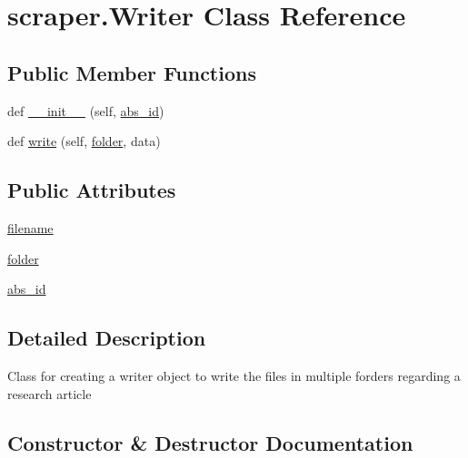\hypertarget{classscraper_1_1_writer}{}\section{scraper.\+Writer Class Reference}
\label{classscraper_1_1_writer}
\subsection*{Public Member Functions}
\begin{DoxyCompactItemize}
\item 
def \hyperlink{classscraper_1_1_writer_afa724461d579e43f6470d7166db1288b}{\+\_\+\+\_\+init\+\_\+\+\_\+} (self, \hyperlink{classscraper_1_1_writer_a56b4acdfb9dc914f431d51dacd60e463}{abs\+\_\+id})
\item 
def \hyperlink{classscraper_1_1_writer_a2b0261659fc51fc3c9fa37231d87d6c7}{write} (self, \hyperlink{classscraper_1_1_writer_a24df154d5f014a262fad63a36036a861}{folder}, data)
\end{DoxyCompactItemize}
\subsection*{Public Attributes}
\begin{DoxyCompactItemize}
\item 
\hyperlink{classscraper_1_1_writer_a5e6006cfece3245121900edb8054de7e}{filename}
\item 
\hyperlink{classscraper_1_1_writer_a24df154d5f014a262fad63a36036a861}{folder}
\item 
\hyperlink{classscraper_1_1_writer_a56b4acdfb9dc914f431d51dacd60e463}{abs\+\_\+id}
\end{DoxyCompactItemize}


\subsection{Detailed Description}
\begin{DoxyVerb}Class for creating a writer object to write the
    files in multiple forders regarding a research article\end{DoxyVerb}
 

\subsection{Constructor \& Destructor Documentation}
